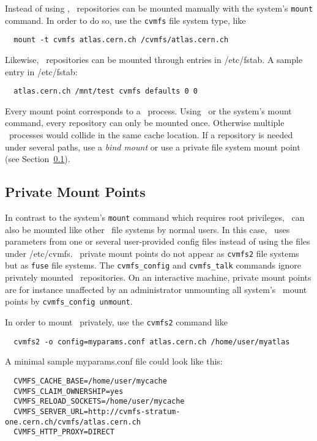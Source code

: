 Instead of using \autofs, \cvmfs\ repositories can be mounted manually with the system's \texttt{mount} command.
In order to do so, use the \texttt{cvmfs} file system type, like
\begin{verbatim}
  mount -t cvmfs atlas.cern.ch /cvmfs/atlas.cern.ch
\end{verbatim}
Likewise, \cvmfs\ repositories can be mounted through entries in /etc/fstab.
A sample entry in /etc/fstab:
\begin{verbatim}
  atlas.cern.ch /mnt/test cvmfs defaults 0 0
\end{verbatim}

Every mount point corresponds to a \cvmfs\ process.
Using \autofs\ or the system's mount command, every repository can only be mounted once.
Otherwise multiple \cvmfs\ processes would collide in the same cache location.
If a repository is needed under several paths, use a \emph{bind mount} or use a private file system mount point (see Section~\ref{sct:privatemount}).

\subsection{Private Mount Points}
\label{sct:privatemount}
In contrast to the system's \texttt{mount} command which requires root privileges, \cvmfs\ can also be mounted like other \fuse\ file systems by normal users.
In this case, \cvmfs\ uses parameters from one or several user-provided config files instead of using the files under /etc/cvmfs.
\cvmfs\ private mount points do not appear as \texttt{cvmfs2} file systems but as \texttt{fuse} file systems.
The \texttt{cvmfs\_config} and \texttt{cvmfs\_talk} commands ignore privately mounted \cvmfs\ repositories.
On an interactive machine, private mount points are for instance unaffected by an administrator unmounting all system's \cvmfs\ mount points by \texttt{cvmfs\_config unmount}.

In order to mount \cvmfs\ privately, use the \texttt{cvmfs2} command like
\begin{verbatim}
  cvmfs2 -o config=myparams.conf atlas.cern.ch /home/user/myatlas
\end{verbatim}
A minimal sample myparams.conf file could look like this:
\begin{verbatim}
  CVMFS_CACHE_BASE=/home/user/mycache
  CVMFS_CLAIM_OWNERSHIP=yes
  CVMFS_RELOAD_SOCKETS=/home/user/mycache
  CVMFS_SERVER_URL=http://cvmfs-stratum-one.cern.ch/cvmfs/atlas.cern.ch
  CVMFS_HTTP_PROXY=DIRECT
\end{verbatim}

